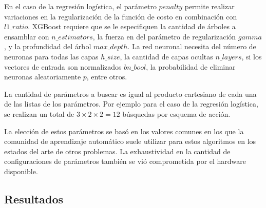 En el caso de la regresión logística, el parámetro $penalty$ permite realizar variaciones en la regularización de la función de costo en combinación con $l1\_ratio$. XGBoost requiere que se le especifiquen la cantidad de árboles a ensamblar con $n\_estimators$, la fuerza en del parámetro de regularización $gamma$, y la profundidad del árbol $max\_depth$. La red neuronal necesita del número de neuronas para todas las capas $h\_size$, la cantidad de capas ocultas $n\_layers$, si los vectores de entrada son normalizados $bn\_bool$, la probabilidad de eliminar neuronas aleatoriamente $p$, entre otros.

La cantidad de parámetros a buscar es igual al producto cartesiano de cada una de las listas de los parámetros. Por ejemplo para el caso de la regresión logística, se realizan un total de $3 \times 2 \times 2 = 12$ búsquedas por esquema de acción.

La elección de estos parámetros se basó en los valores comunes en los que la comunidad de aprendizaje automático suele utilizar para estos algoritmos en los estados del arte de otros problemas. La exhaustividad en la cantidad de configuraciones de parámetros también se vió comprometida por el hardware disponible.

\subsection{Resultados}

